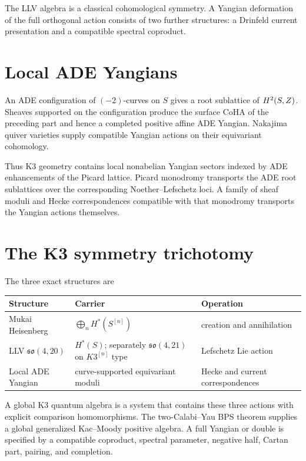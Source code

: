 The LLV algebra is a classical cohomological symmetry. A Yangian deformation of the full orthogonal action consists of two further structures: a Drinfeld current presentation and a compatible spectral coproduct.

\chapter{Local ADE Yangians}
An ADE configuration of $(-2)$-curves on $S$ gives a root sublattice of $H^2(S,Z)$. Sheaves supported on the configuration produce the surface CoHA of the preceding part and hence a completed positive affine ADE Yangian. Nakajima quiver varieties supply compatible Yangian actions on their equivariant cohomology.

Thus K3 geometry contains local nonabelian Yangian sectors indexed by ADE enhancements of the Picard lattice. Picard monodromy transports the ADE root sublattices over the corresponding Noether--Lefschetz loci. A family of sheaf moduli and Hecke correspondences compatible with that monodromy transports the Yangian actions themselves.

\chapter{The K3 symmetry trichotomy}
The three exact structures are
\begin{center}
\small
\begin{tabularx}{0.96\textwidth}{@{}>{\raggedright\arraybackslash}p{}>{\raggedright\arraybackslash}X>{\raggedright\arraybackslash}p{}@{}}
\toprule
\textbf{Structure}&\textbf{Carrier}&\textbf{Operation}\\
\midrule
Mukai Heisenberg&$\bigoplus_nH^*(S^{[n]})$&creation and annihilation\\
LLV $\mathfrak{so}(4,20)$&$H^*(S)$; separately $\mathfrak{so}(4,21)$ on $K3^{[n]}$ type&Lefschetz Lie action\\
Local ADE Yangian&curve-supported equivariant moduli&Hecke and current correspondences\\
\bottomrule
\end{tabularx}
\end{center}
A global K3 quantum algebra is a system that contains these three actions with explicit comparison homomorphisms. The two-Calabi--Yau BPS theorem supplies a global generalized Kac--Moody positive algebra. A full Yangian or double is specified by a compatible coproduct, spectral parameter, negative half, Cartan part, pairing, and completion.

